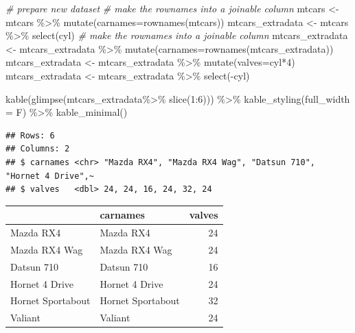 \documentclass[
]{article}
\newenvironment{Shaded}{\begin{snugshade}}{\end{snugshade}}
\newcommand{\AttributeTok}[1]{\textcolor[rgb]{0.77,0.63,0.00}{#1}}
\newcommand{\CommentTok}[1]{\textcolor[rgb]{0.56,0.35,0.01}{\textit{#1}}}
\newcommand{\DecValTok}[1]{\textcolor[rgb]{0.00,0.00,0.81}{#1}}
\newcommand{\FunctionTok}[1]{\textcolor[rgb]{0.00,0.00,0.00}{#1}}
\newcommand{\NormalTok}[1]{#1}
\newcommand{\OtherTok}[1]{\textcolor[rgb]{0.56,0.35,0.01}{#1}}
\newcommand{\SpecialCharTok}[1]{\textcolor[rgb]{0.00,0.00,0.00}{#1}}
\begin{document}
\begin{Shaded}
\begin{Highlighting}[]
\CommentTok{\# prepare new dataset}
\CommentTok{\# make the rownames into a \textquotesingle{}joinable\textquotesingle{} column}
\NormalTok{mtcars }\OtherTok{\textless{}{-}}\NormalTok{ mtcars }\SpecialCharTok{\%\textgreater{}\%} \FunctionTok{mutate}\NormalTok{(}\AttributeTok{carnames=}\FunctionTok{rownames}\NormalTok{(mtcars)) }
\NormalTok{mtcars\_extradata }\OtherTok{\textless{}{-}}\NormalTok{ mtcars }\SpecialCharTok{\%\textgreater{}\%} \FunctionTok{select}\NormalTok{(cyl)}
\CommentTok{\# make the rownames into a \textquotesingle{}joinable\textquotesingle{} column}
\NormalTok{mtcars\_extradata }\OtherTok{\textless{}{-}}\NormalTok{ mtcars\_extradata }\SpecialCharTok{\%\textgreater{}\%}
\FunctionTok{mutate}\NormalTok{(}\AttributeTok{carnames=}\FunctionTok{rownames}\NormalTok{(mtcars\_extradata)) }
\NormalTok{mtcars\_extradata }\OtherTok{\textless{}{-}}\NormalTok{ mtcars\_extradata }\SpecialCharTok{\%\textgreater{}\%} \FunctionTok{mutate}\NormalTok{(}\AttributeTok{valves=}\NormalTok{cyl}\SpecialCharTok{*}\DecValTok{4}\NormalTok{)}
\NormalTok{mtcars\_extradata }\OtherTok{\textless{}{-}}\NormalTok{ mtcars\_extradata }\SpecialCharTok{\%\textgreater{}\%} \FunctionTok{select}\NormalTok{(}\SpecialCharTok{{-}}\NormalTok{cyl)}

\FunctionTok{kable}\NormalTok{(}\FunctionTok{glimpse}\NormalTok{(mtcars\_extradata}\SpecialCharTok{\%\textgreater{}\%} \FunctionTok{slice}\NormalTok{(}\DecValTok{1}\SpecialCharTok{:}\DecValTok{6}\NormalTok{))) }\SpecialCharTok{\%\textgreater{}\%}  
  \FunctionTok{kable\_styling}\NormalTok{(}\AttributeTok{full\_width =}\NormalTok{ F) }\SpecialCharTok{\%\textgreater{}\%}
  \FunctionTok{kable\_minimal}\NormalTok{()}
\end{Highlighting}
\end{Shaded}

\begin{verbatim}
## Rows: 6
## Columns: 2
## $ carnames <chr> "Mazda RX4", "Mazda RX4 Wag", "Datsun 710", "Hornet 4 Drive",~
## $ valves   <dbl> 24, 24, 16, 24, 32, 24
\end{verbatim}

\begin{table}
\centering
\begin{tabular}{l|l|r}
\hline
  & carnames & valves\\
\hline
Mazda RX4 & Mazda RX4 & 24\\
\hline
Mazda RX4 Wag & Mazda RX4 Wag & 24\\
\hline
Datsun 710 & Datsun 710 & 16\\
\hline
Hornet 4 Drive & Hornet 4 Drive & 24\\
\hline
Hornet Sportabout & Hornet Sportabout & 32\\
\hline
Valiant & Valiant & 24\\
\hline
\end{tabular}
\end{table}
\end{document}
